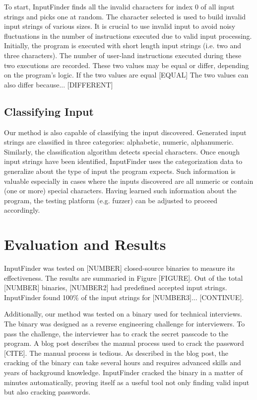 \documentclass[10pt,twocolumn]{article}
\def \tool {InputFinder}
\begin{document}
To start, \tool{} finds all the invalid characters for index 0 of all input strings and picks one at random.
The character selected is used to build invalid input strings of various sizes.
It is crucial to use invalid input to avoid noisy fluctuations in the number of instructions executed due to valid input processing.
Initially, the program is executed with short length input strings (i.e. two and three characters).
The number of user-land instructions executed during these two executions are recorded.
These two values may be equal or differ, depending on the program's logic.
If the two values are equal [EQUAL]
The two values can also differ because... [DIFFERENT]


\subsection{Classifying Input}

Our method is also capable of classifying the input discovered.
Generated input strings are classified in three categories: alphabetic, numeric, alphanumeric.
Similarly, the classification algorithm detects special characters.
Once enough input strings have been identified, \tool{} uses the categorization data to generalize about the type of input the program expects.
Such information is valuable especially in cases where the inputs discovered are all numeric or contain (one or more) special characters.
Having learned such information about the program, the testing platform (e.g. fuzzer) can be adjusted to proceed accordingly.

\section{Evaluation and Results}

\tool{} was tested on [NUMBER] closed-source binaries to measure its effectiveness.
The results are summaried in Figure [FIGURE].
Out of the total [NUMBER] binaries, [NUMBER2] had predefined accepted input strings.
\tool{} found 100\% of the input strings for [NUMBER3]...
[CONTINUE].

Additionally, our method was tested on a binary used for technical interviews.
The binary was designed as a reverse engineering challenge for interviewers.
To pass the challenge, the interviewer has to crack the secret passcode to the program.
A blog post describes the manual process used to crack the password [CITE].
The manual process is tedious.
As described in the blog post, the cracking of the binary can take several hours and requires advanced skills and years of background knowledge.
\tool{} cracked the binary in a matter of minutes automatically, proving itself as a useful tool not only finding valid input but also cracking passwords.
\end{document}
